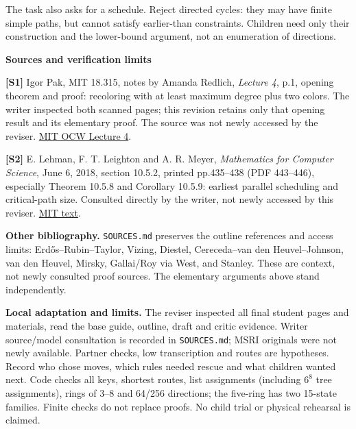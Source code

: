 \documentclass[10pt]{article}
\newcommand{\head}[1]{\par{\large\bfseries #1}\par}
\newcommand{\word}[1]{\texttt{#1}}
\begin{document}
The task also asks for a schedule. Reject directed cycles: they may have finite simple paths, but cannot satisfy earlier-than constraints. Children need only their construction and the lower-bound argument, not an enumeration of directions.

\head{Sources and verification limits}
\textbf{[S1]} Igor Pak, MIT 18.315, notes by Amanda Redlich, \emph{Lecture 4}, p.1, opening theorem and proof: recoloring with at least maximum degree plus two colors. The writer inspected both scanned pages; this revision retains only that opening result and its elementary proof. The source was not newly accessed by the reviser. \href{https://ocw.mit.edu/courses/18-315-combinatorial-theory-introduction-to-graph-theory-extremal-and-enumerative-combinatorics-spring-2005/1a85b3cef5c53f1dbab7dd5d18b54035_lec04.pdf}{MIT OCW Lecture 4}.

\textbf{[S2]} E. Lehman, F. T. Leighton and A. R. Meyer, \emph{Mathematics for Computer Science}, June 6, 2018, section 10.5.2, printed pp.435--438 (PDF 443--446), especially Theorem 10.5.8 and Corollary 10.5.9: earliest parallel scheduling and critical-path size. Consulted directly by the writer, not newly accessed by this reviser. \href{https://courses.csail.mit.edu/6.042/spring18/mcs.pdf}{MIT text}.

\textbf{Other bibliography.} \word{SOURCES.md} preserves the outline references and access limits: Erd\H{o}s--Rubin--Taylor, Vizing, Diestel, Cereceda--van den Heuvel--Johnson, van den Heuvel, Mirsky, Gallai/Roy via West, and Stanley. These are context, not newly consulted proof sources. The elementary arguments above stand independently.

\textbf{Local adaptation and limits.} The reviser inspected all final student pages and materials, read the base guide, outline, draft and critic evidence. Writer source/model consultation is recorded in \word{SOURCES.md}; MSRI originals were not newly available. Partner checks, low transcription and routes are hypotheses. Record who chose moves, which rules needed rescue and what children wanted next. Code checks all keys, shortest routes, list assignments (including $6^8$ tree assignments), rings of 3--8 and 64/256 directions; the five-ring has two 15-state families. Finite checks do not replace proofs. No child trial or physical rehearsal is claimed.
\end{document}
